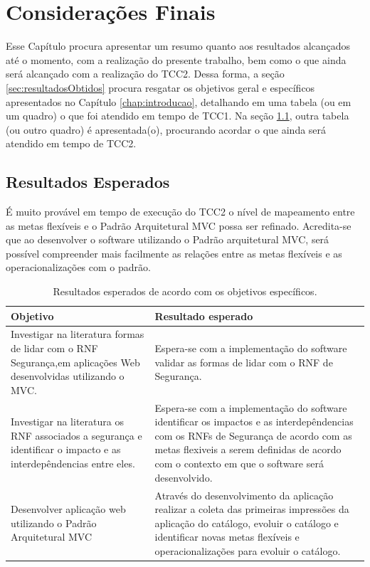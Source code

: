 \chapter{Considerações Finais}
\label{chap:consideracoesFinais}

Esse Capítulo procura apresentar um resumo quanto aos resultados alcançados até o momento, com a realização do presente trabalho, bem como o que ainda será alcançado com a realização do TCC2. Dessa forma, a seção \ref{sec:resultadosObtidos} procura resgatar os objetivos geral e específicos apresentados no Capítulo \ref{chap:introducao}, detalhando em uma tabela (ou em um quadro) o que foi atendido em tempo de TCC1. Na seção \ref{sec:resultadosEsperados}, outra tabela (ou outro quadro) é apresentada(o), procurando acordar o que ainda será atendido em tempo de TCC2.


\section{Resultados Esperados}
\label{sec:resultadosEsperados}

É muito provável em tempo de execução do TCC2 o nível de mapeamento entre as metas flexíveis e o  Padrão Arquitetural MVC possa ser refinado. Acredita-se que ao desenvolver o software utilizando o Padrão arquitetural MVC, será possível compreender mais facilmente as relações entre as metas flexíveis e as operacionalizações com o padrão. 


\begin{table}[h!]
	\centering
	\caption{Resultados esperados de acordo com os objetivos específicos.}
	\label{resultadosEsperados}
	\tiny
	\begin{tabular}{@{}p{8cm}p{7.5cm}@{}}
		\toprule
		\textbf{Objetivo} & \textbf{Resultado esperado} \\ \midrule
		Investigar na literatura formas de lidar com o RNF Segurança,em aplicações Web desenvolvidas utilizando o MVC. & Espera-se com a implementação do software validar as formas de lidar com o RNF de Segurança. \\
		\rowcolor[HTML]{C0C0C0} 
		Investigar na literatura os RNF associados a segurança e identificar o impacto e as interdepêndencias entre eles. & Espera-se com a implementação do software identificar os impactos e as interdepêndencias com os RNFs de Segurança de acordo com as metas flexiveis a serem definidas de acordo com o contexto em que o software será desenvolvido. \\
		Desenvolver aplicação web utilizando o Padrão Arquitetural MVC & Através do desenvolvimento da aplicação realizar a coleta das primeiras impressões da aplicação do catálogo, evoluir o catálogo e identificar novas metas flexíveis e operacionalizações para evoluir o catálogo. \\ \bottomrule
	\end{tabular}
\end{table}

